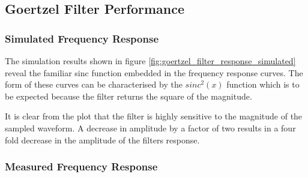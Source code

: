 \subsection{Goertzel Filter Performance}

\subsubsection{Simulated Frequency Response}

The simulation results shown in figure \ref{fig:goertzel_filter_response_simulated} reveal the familiar sinc function embedded in the frequency response curves. The form of these curves can be characterised by the $sinc^2(x)$ function which is to be expected because the filter returns the square of the magnitude.

It is clear from the plot that the filter is highly sensitive to the magnitude of the sampled waveform. A decrease in amplitude by a factor of two results in a four fold decrease in the amplitude of the filters response.




\subsubsection{Measured Frequency Response}

